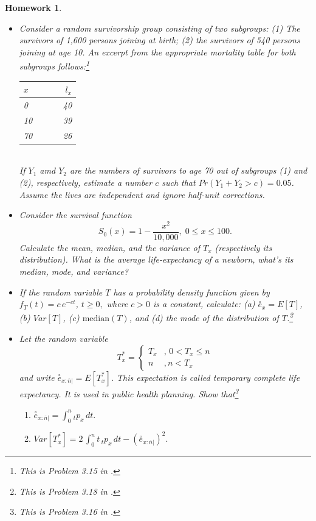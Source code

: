 \documentclass[11pt,fleqn,oneside]{book}
\newtheorem{homework}{Homework}
\begin{document}
\begin{homework}
\label{HW5}
\begin{itemize}
\item Consider a random survivorship group consisting of two subgroups: (1) The survivors of 1,600 persons joining at birth; (2) the survivors of 540 persons joining at age 10. An excerpt from the appropriate mortality table for both subgroups follows:\footnote{This is Problem 3.15 in \cite{BOWERS}.}\\
\begin{tabular} {l r}
\hline
$x\;\;\;\;\;\;$ & $\;\;\;\;\;\;l_x$\\
\hline
0 & 40\\
10 & 39 \\ 
70 & 26\\
\hline
\end{tabular}\\
If $Y_1$ amd $Y_2$ are the numbers of survivors to age 70 out of subgroups (1) and (2), respectively, estimate a number $c$ such that $Pr(Y_1 + Y_2 > c) = 0.05$. Assume the lives are independent and ignore half-unit corrections.  
\item Consider the survival function
$$
S_0(x) = 1 - \frac{x^2}{10,000},\;0\leq x \leq 100.
$$
Calculate the mean, median, and the variance of $T_x$ (respectively its distribution). What is the average life-expectancy of a newborn, what's its median, mode, and variance?
\item If the random variable $T$ has a probability density function given by  $f_T(t) = c\,e^{-ct}$, $t\geq 0,$ where $c>0$ is a constant, calculate:  (a) $\stackrel{\circ}{e}_x = E[T]$, (b) $Var[T]$, (c) $\text{median}(T)$, and (d) the mode of the distribution of $T$.\footnote{This is Problem 3.18 in \cite{BOWERS}.}
\item Let the random variable
$$
T^*_x = \left\{\begin{array}{ll} T_x &,\,0<T_x\leq n \\ n &, n<T_x \end{array}\right.
$$
and  write $\stackrel{\circ}{e}_{x:\overline{n}|} = E[T^*_x]$. This expectation is called \textit{temporary complete life expectancy}. It is used in public health planning. Show that\footnote{This is Problem 3.16 in \cite{BOWERS}.}
\begin{enumerate}
\item $\stackrel{\circ}{e}_{x:\overline{n}|} = \int_0^n {_tp_x}\,dt.$
\item $Var[T^*_x] = 2\, \int_0^n t\,{_tp_x}\,dt - (\stackrel{\circ}{e}_{x:\overline{n}|})^2.$
\end{enumerate}
\end{itemize}
\end{homework}
\end{document}
